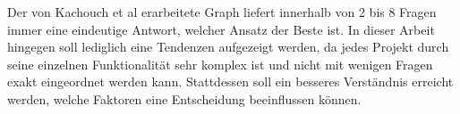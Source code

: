 Der von Kachouch et al erarbeitete Graph liefert innerhalb von 2 bis 8 Fragen immer eine eindeutige Antwort, welcher Ansatz der Beste ist. In dieser Arbeit hingegen soll lediglich eine Tendenzen aufgezeigt werden, da jedes Projekt durch seine einzelnen Funktionalität sehr komplex ist und nicht mit wenigen Fragen exakt eingeordnet werden kann. Stattdessen soll ein besseres Verständnis erreicht werden, welche Faktoren eine Entscheidung beeinflussen können. 